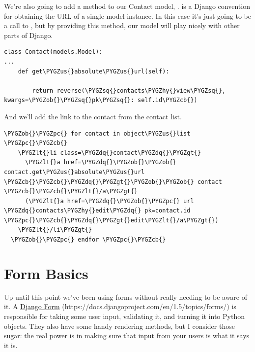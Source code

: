\documentclass[letterpaper,10pt,english]{sphinxmanual}
\def\PYGZus{\char`\_}
\def\PYGZob{\char`\{}
\def\PYGZcb{\char`\}}
\def\PYGZlt{\char`\<}
\def\PYGZgt{\char`\>}
\def\PYGZpc{\char`\%}
\def\PYGZhy{\char`\-}
\def\PYGZsq{\char`\'}
\def\PYGZdq{\char`\"}
\renewcommand\PYGZsq{\textquotesingle}
\begin{document}
We're also going to add a method to our Contact model,
.  is a Django convention for
obtaining the URL of a single model instance. In this case it's just
going to be a call to , but by providing this method, our
model will play nicely with other parts of Django.

\begin{Verbatim}[commandchars=\\\{\}]
class Contact(models.Model):
...
    def get\PYGZus{}absolute\PYGZus{}url(self):

        return reverse(\PYGZsq{}contacts\PYGZhy{}view\PYGZsq{}, kwargs=\PYGZob{}\PYGZsq{}pk\PYGZsq{}: self.id\PYGZcb{})
\end{Verbatim}

And we'll add the link to the contact from the contact list.

\begin{Verbatim}[commandchars=\\\{\}]
  \PYGZob{}\PYGZpc{} for contact in object\PYGZus{}list \PYGZpc{}\PYGZcb{}
    \PYGZlt{}li class=\PYGZdq{}contact\PYGZdq{}\PYGZgt{}
      \PYGZlt{}a href=\PYGZdq{}\PYGZob{}\PYGZob{} contact.get\PYGZus{}absolute\PYGZus{}url \PYGZcb{}\PYGZcb{}\PYGZdq{}\PYGZgt{}\PYGZob{}\PYGZob{} contact \PYGZcb{}\PYGZcb{}\PYGZlt{}/a\PYGZgt{}
      (\PYGZlt{}a href=\PYGZdq{}\PYGZob{}\PYGZpc{} url \PYGZdq{}contacts\PYGZhy{}edit\PYGZdq{} pk=contact.id \PYGZpc{}\PYGZcb{}\PYGZdq{}\PYGZgt{}edit\PYGZlt{}/a\PYGZgt{})
    \PYGZlt{}/li\PYGZgt{}
  \PYGZob{}\PYGZpc{} endfor \PYGZpc{}\PYGZcb{}
\end{Verbatim}


\chapter{Form Basics}
\label{tutorial/forms::doc}\label{tutorial/forms:selenium}\label{tutorial/forms:form-basics}
Up until this point we've been using forms without really needing to
be aware of it. A \href{https://docs.djangoproject.com/en/1.5/topics/forms/}{Django Form} (https://docs.djangoproject.com/en/1.5/topics/forms/) is responsible for taking some user
input, validating it, and turning it into Python objects. They also
have some handy rendering methods, but I consider those sugar: the
real power is in making sure that input from your users is what it
says it is.
\end{document}
